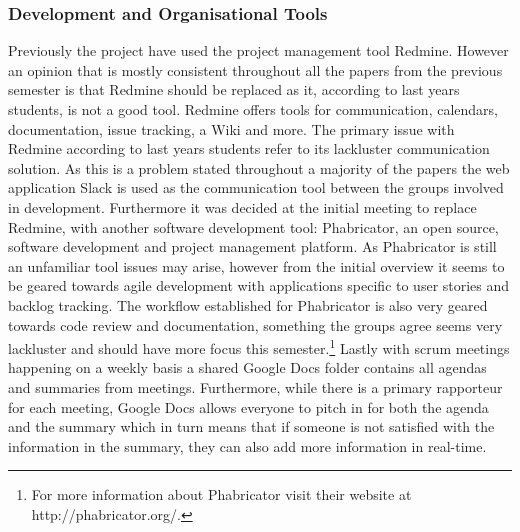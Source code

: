 \subsubsection*{Development and Organisational Tools}
Previously the project have used the project management tool Redmine.
However an opinion that is mostly consistent throughout all the papers from the previous semester is that Redmine should be replaced as it, according to last years students, is not a good tool.
Redmine offers tools for communication, calendars, documentation, issue tracking, a Wiki and more.
The primary issue with Redmine according to last years students refer to its lackluster communication solution.
As this is a problem stated throughout a majority of the papers the web application Slack is used as the communication tool between the groups involved in development.
Furthermore it was decided at the initial meeting to replace Redmine, with another software development tool: Phabricator, an open source, software development and project management platform. 
As Phabricator is still an unfamiliar tool issues may arise, however from the initial overview it seems to be geared towards agile development with applications specific to user stories and backlog tracking.
The workflow established for Phabricator is also very geared towards code review and documentation, something the groups agree seems very lackluster and should have more focus this semester.\footnote{For more information about Phabricator visit their website at http://phabricator.org/.}
Lastly with scrum meetings happening on a weekly basis a shared Google Docs folder contains all agendas and summaries from meetings.
Furthermore, while there is a primary rapporteur for each meeting, Google Docs allows everyone to pitch in for both the agenda and the summary which in turn means that if someone is not satisfied with the information in the summary, they can also add more information in real-time.
